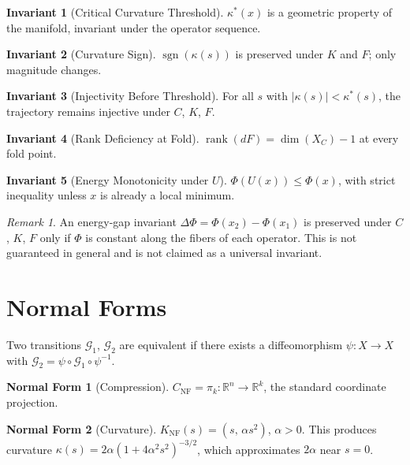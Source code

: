 \documentclass[12pt, oneside]{book}
\theoremstyle{plain}
\theoremstyle{definition}
\newtheorem{invariant}{Invariant}[section]
\newtheorem{normalform}{Normal Form}[section]
\theoremstyle{remark}
\newtheorem{remark}{Remark}[section]
\begin{document}
\begin{invariant}[Critical Curvature Threshold]
$\kappa^*(x)$ is a geometric property of the manifold, invariant under
the operator sequence.
\end{invariant}

\begin{invariant}[Curvature Sign]
$\operatorname{sgn}(\kappa(s))$ is preserved under $K$ and $F$; only
magnitude changes.
\end{invariant}

\begin{invariant}[Injectivity Before Threshold]
For all $s$ with $|\kappa(s)| < \kappa^*(s)$, the trajectory remains
injective under $C$, $K$, $F$.
\end{invariant}

\begin{invariant}[Rank Deficiency at Fold]
$\operatorname{rank}(dF) = \dim(X_C) - 1$ at every fold point.
\end{invariant}

\begin{invariant}[Energy Monotonicity under $U$]
$\Phi(U(x)) \le \Phi(x)$, with strict inequality unless $x$ is
already a local minimum.
\end{invariant}

\begin{remark}
An energy-gap invariant $\Delta\Phi = \Phi(x_2) - \Phi(x_1)$ is
preserved under $C$, $K$, $F$ only if $\Phi$ is constant along the
fibers of each operator. This is not guaranteed in general and is not
claimed as a universal invariant.
\end{remark}

\section{Normal Forms}

Two transitions $\mathcal{G}_1$, $\mathcal{G}_2$ are equivalent if
there exists a diffeomorphism $\psi : X \to X$ with
$\mathcal{G}_2 = \psi \circ \mathcal{G}_1 \circ \psi^{-1}$.

\begin{normalform}[Compression]
$C_{\mathrm{NF}} = \pi_k : \mathbb{R}^n \to \mathbb{R}^k$, the
standard coordinate projection.
\end{normalform}

\begin{normalform}[Curvature]
$K_{\mathrm{NF}}(s) = (s,\, \alpha s^2)$, $\alpha > 0$. This
produces curvature
$\kappa(s) = 2\alpha(1 + 4\alpha^2 s^2)^{-3/2}$, which approximates
$2\alpha$ near $s = 0$.
\end{normalform}
\end{document}
